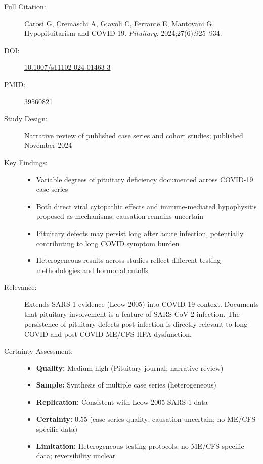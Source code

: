 \begin{description}
    \item[Full Citation:] Carosi G, Cremaschi A, Giavoli C, Ferrante E, Mantovani G. Hypopituitarism and COVID-19. \textit{Pituitary}. 2024;27(6):925--934. \cite{Carosi2024hypopituitarism}
    \item[DOI:] \href{https://doi.org/10.1007/s11102-024-01463-3}{10.1007/s11102-024-01463-3}
    \item[PMID:] 39560821
    \item[Study Design:] Narrative review of published case series and cohort studies; published November 2024
    \item[Key Findings:]
    \begin{itemize}
        \item Variable degrees of pituitary deficiency documented across COVID-19 case series
        \item Both direct viral cytopathic effects and immune-mediated hypophysitis proposed as mechanisms; causation remains uncertain
        \item Pituitary defects may persist long after acute infection, potentially contributing to long COVID symptom burden
        \item Heterogeneous results across studies reflect different testing methodologies and hormonal cutoffs
    \end{itemize}
    \item[Relevance:] Extends SARS-1 evidence (Leow 2005) into COVID-19 context. Documents that pituitary involvement is a feature of SARS-CoV-2 infection. The persistence of pituitary defects post-infection is directly relevant to long COVID and post-COVID ME/CFS HPA dysfunction.
    \item[Certainty Assessment:]
    \begin{itemize}
        \item \textbf{Quality:} Medium-high (Pituitary journal; narrative review)
        \item \textbf{Sample:} Synthesis of multiple case series (heterogeneous)
        \item \textbf{Replication:} Consistent with Leow 2005 SARS-1 data
        \item \textbf{Certainty:} 0.55 (case series quality; causation uncertain; no ME/CFS-specific data)
        \item \textbf{Limitation:} Heterogeneous testing protocols; no ME/CFS-specific data; reversibility unclear
    \end{itemize}
\end{description}

